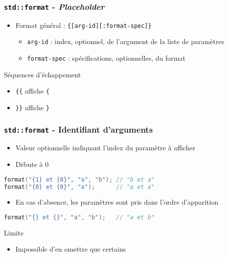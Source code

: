 \documentclass[C++.tex]{subfiles}
\begin{document}
\begin{frame}[fragile]
	\frametitle{\lstinline|std::format| - \textit{Placeholder}}
	\begin{itemize}
		\item Format général : \lstinline|{[arg-id][:format-spec]}|
		\begin{itemize}
			\item \lstinline|arg-id| : index, optionnel, de l'argument de la liste de paramètres
			\item \lstinline|format-spec| : spécifications, optionnelles, du format
		\end{itemize}
	\end{itemize}

	\begin{block}{Séquences d'échappement}
		\begin{itemize}
			\item \lstinline|{{| affiche \lstinline|{|
			\item \lstinline|}}| affiche \lstinline|}|
		\end{itemize}
	\end{block}
\end{frame}

\begin{frame}[fragile]
	\frametitle{\lstinline|std::format| - Identifiant d'arguments}
	\begin{itemize}
		\item Valeur optionnelle indiquant l'index du paramètre à afficher
		\item Débute à 0
	\end{itemize}

	\begin{lstlisting}[language=C++]
format("{1} et {0}", "a", "b"); // "b et a"
format("{0} et {0}", "a");      // "a et a"\end{lstlisting}

	\begin{itemize}
		\item En cas d'absence, les paramètres sont pris dans l'ordre d'apparition
	\end{itemize}

	\begin{lstlisting}[language=C++]
format("{} et {}", "a", "b"); 	// "a et b"\end{lstlisting}
	
	\begin{alertblock}{Limite}
		\begin{itemize}
			\item Impossible d'en omettre que certains
		\end{itemize}
	\end{alertblock}
\end{frame}
\end{document}
